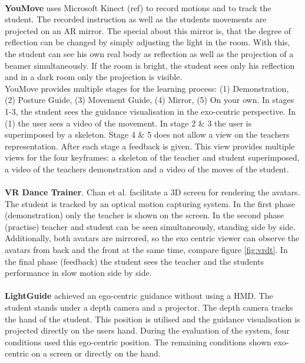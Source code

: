 $ $\\
\textbf{YouMove} uses Microsoft Kinect (\todo ref) to record motions and to track the student. The recorded instruction as well as the students movements are projected on an AR mirror. The special about this mirror is, that the degree of reflection can be changed by simply adjusting the light in the room. With this, the student can see his own real body as reflection as well as the projection of a beamer simultaneously. If the room is bright, the student sees only his reflection and in a dark room only the projection is visible.\\ 
YouMove provides multiple stages for the learning process: (1) Demonstration, (2) Posture Guide, (3) Movement Guide, (4) Mirror, (5) On your own. In stages 1-3, the student sees the guidance visualisation in the exo-centric perspective. In (1) the user sees a video of the movement. In stage 2 \& 3 the user is superimposed by a skeleton. Stage 4 \& 5 does not allow a view on the teachers representation. After each stage a feedback is given. This view provides multiple views for the four keyframes: a skeleton of the teacher and student superimposed, a video of the teachers demonstration and a video of the moves of the student.\\ \\
\textbf{VR Dance Trainer}. Chan et al. \cite{Chan2011a} facilitate a 3D screen for rendering the avatars. The student is tracked by an optical motion capturing system. In the first phase (demonstration) only the teacher is shown on the screen. In the second phase (practise) teacher and student can be seen simultaneously, standing side by side. Additionally, both avatars are mirrored, so the exo centric viewer can observe the avatars from back and the front at the same time, compare figure \ref{fig:vrdt}. In the final phase (feedback) the student sees the teacher and the students performance in slow motion side by side.\\ \\
\textbf{LightGuide} \cite{Sodhi2012} achieved an ego-centric guidance without using a HMD. The student stands under a depth camera and a projector. The depth camera tracks the hand of the student. This position is utilised and the guidance visualisation is projected directly on the users hand. During the evaluation of the system, four conditions used this ego-centric position. The remaining conditions shown exo-centric on a screen or directly on the hand.\\ \\
